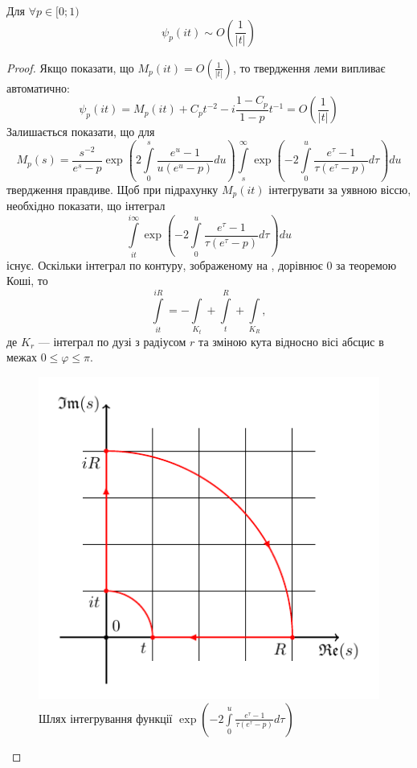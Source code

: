 \begin{lem}
Для $\forall p \in [0; 1)$
\begin{equation}
\psi_{p}(it) \sim O\left(\frac{1}{|t|}\right)
\end{equation}
\begin{proof}
Якщо показати, що $M_{p}(it) = O\left(\frac{1}{|t|}\right)$, то твердження леми випливає автоматично:
\begin{equation*}
\psi_{p}(it)=M_{p}(it) + C_{p} t^{-2} - i \frac{1-C_{p}}{1 - p} t^{-1} = O\left(\frac{1}{|t|}\right)
\end{equation*}
Залишається показати, що для
\begin{equation*}
M_{p}(s) = \frac{s^{-2}}{e^s-p} \exp \left(2 \int\limits_{0}^{s} \frac{e^u -1}{u(e^u - p)} du\right) \int\limits_s^\infty \exp\left(-2 \int\limits_{0}^{u} \frac{e^\tau -1}{\tau(e^\tau - p)} d\tau\right) du 
\end{equation*}
твердження правдиве. Щоб при підрахунку $M_{p}(it)$ інтегрувати за уявною віссю, необхідно показати, що інтеграл
\begin{equation*}
\int\limits_{it}^{i\infty} \exp\left(-2 \int\limits_{0}^{u} \frac{e^\tau -1}{\tau(e^\tau - p)} d\tau\right) du 
\end{equation*}
існує. Оскільки інтеграл по контуру, зображеному на , дорівнює 0 за теоремою Коші, то
\begin{equation*}
\int\limits_{it}^{iR} = -\int\limits_{K_{t}} + \int\limits_{t}^{R} + \int\limits_{K_{R}},
\end{equation*}
де $K_{r}$ --- інтеграл по дузі з радіусом $r$ та зміною кута відносно вісі абсцис в межах $0 \leq \varphi \leq \pi$.
\begin{figure}[h]
	\centering
	\includegraphics{chapter_Asymptotics/img/contour_quarter}
	\caption{Шлях інтегрування функції $\exp\left(-2 \int\limits_{0}^{u} \frac{e^\tau -1}{\tau(e^\tau - p)} d\tau\right)$}
	\label{fig:contour_phi}
\end{figure}


\end{proof}
\end{lem}
